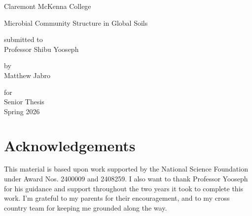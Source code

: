 \documentclass[12pt, oneside]{report}
\begin{document}

\begin{titlepage}
  \centering
  \vspace*{1.5in}
  {\normalsize Claremont McKenna College}\par
  \vspace{0.5in}
  {\Large Microbial Community Structure in Global Soils}\par
  \vfill
  {\normalsize
    submitted to\\[0.4em]
    Professor Shibu Yooseph
  }\par
  \vspace{1.0in}
  {\normalsize
    by\\[0.4em]
    Matthew Jabro
  }\par
  \vspace{1.0in}
  {\normalsize
    for\\[0.4em]
    Senior Thesis\\[0.4em]
    Spring 2026\\[0.4em]
  }\par
  \vspace*{1.0in}
\end{titlepage}

\setcounter{page}{2}

\chapter*{Acknowledgements}

This material is based upon work supported by the National Science Foundation under Award Nos. 2400009 and 2408259. I also want to thank Professor Yooseph for his guidance and support throughout the two years it took to complete this work. I'm grateful to my parents for their encouragement, and to my cross country team for keeping me grounded along the way.


\newpage

\end{document}
